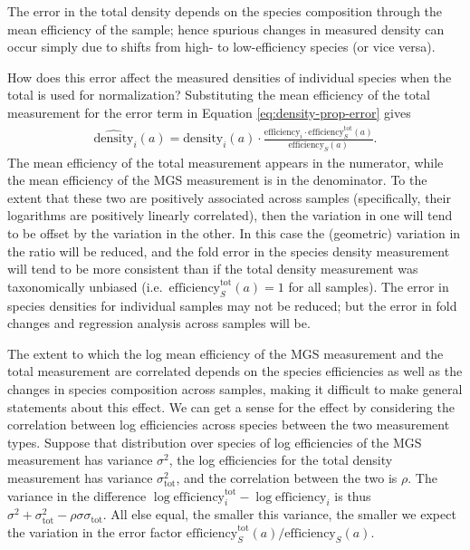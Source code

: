 \documentclass[
]{article}
\begin{document}
The error in the total density depends on the species composition through the mean efficiency of the sample; hence spurious changes in measured density can occur simply due to shifts from high- to low-efficiency species (or vice versa).

How does this error affect the measured densities of individual species when the total is used for normalization?
Substituting the mean efficiency of the total measurement for the error term in Equation \eqref{eq:density-prop-error} gives
\begin{align}
  \label{eq:density-prop-error-with-total-error}
  \widehat{\text{density}}_{i}(a) 
  = \text{density}_{i}(a) \cdot \frac{\text{efficiency}_{i} \cdot \text{efficiency}^{\text{tot}}_S(a)}{\text{efficiency}_S(a)}.
\end{align}
The mean efficiency of the total measurement appears in the numerator, while the mean efficiency of the MGS measurement is in the denominator.
To the extent that these two are positively associated across samples (specifically, their logarithms are positively linearly correlated), then the variation in one will tend to be offset by the variation in the other.
In this case the (geometric) variation in the ratio will be reduced, and the fold error in the species density measurement will tend to be more consistent than if the total density measurement was taxonomically unbiased (i.e.~\(\text{efficiency}^\text{tot}_S(a) = 1\) for all samples).
The error in species densities for individual samples may not be reduced; but the error in fold changes and regression analysis across samples will be.

The extent to which the log mean efficiency of the MGS measurement and the total measurement are correlated depends on the species efficiencies as well as the changes in species composition across samples, making it difficult to make general statements about this effect.
We can get a sense for the effect by considering the correlation between log efficiencies across species between the two measurement types.
Suppose that distribution over species of log efficiencies of the MGS measurement has variance \(\sigma^{2}\), the log efficiencies for the total density measurement has variance \(\sigma_{\text{tot}}^{2}\), and the correlation between the two is \(\rho\).
The variance in the difference \(\log \text{efficiency}_{i}^{\text{tot}} - \log \text{efficiency}_{i}\) is thus \(\sigma^{2} + \sigma_{\text{tot}}^{2} - \rho \sigma \sigma_{\text{tot}}\).
All else equal, the smaller this variance, the smaller we expect the variation in the error factor \(\text{efficiency}^{\text{tot}}_S(a)/ \text{efficiency}_S(a)\).
\end{document}
